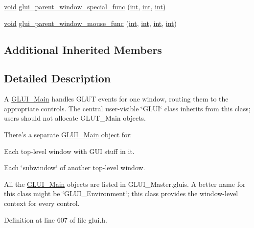 \begin{DoxyCompactItemize}
\item 
\hyperlink{wglext_8h_a9e6b7f1933461ef318bb000d6bd13b83}{void} \hyperlink{class_g_l_u_i___main_ab729b572b9acaffe3ebc827b6cfd72ca}{glui\+\_\+parent\+\_\+window\+\_\+special\+\_\+func} (\hyperlink{wglext_8h_a500a82aecba06f4550f6849b8099ca21}{int}, \hyperlink{wglext_8h_a500a82aecba06f4550f6849b8099ca21}{int}, \hyperlink{wglext_8h_a500a82aecba06f4550f6849b8099ca21}{int})
\item 
\hyperlink{wglext_8h_a9e6b7f1933461ef318bb000d6bd13b83}{void} \hyperlink{class_g_l_u_i___main_a391c1191451c678e7702e593e74dc5a4}{glui\+\_\+parent\+\_\+window\+\_\+mouse\+\_\+func} (\hyperlink{wglext_8h_a500a82aecba06f4550f6849b8099ca21}{int}, \hyperlink{wglext_8h_a500a82aecba06f4550f6849b8099ca21}{int}, \hyperlink{wglext_8h_a500a82aecba06f4550f6849b8099ca21}{int}, \hyperlink{wglext_8h_a500a82aecba06f4550f6849b8099ca21}{int})
\end{DoxyCompactItemize}
\subsection*{Additional Inherited Members}


\subsection{Detailed Description}
A \hyperlink{class_g_l_u_i___main}{G\+L\+U\+I\+\_\+\+Main} handles G\+L\+U\+T events for one window, routing them to the appropriate controls. The central user-\/visible \char`\"{}\+G\+L\+U\+I\char`\"{} class inherits from this class; users should not allocate G\+L\+U\+T\+\_\+\+Main objects.

There's a separate \hyperlink{class_g_l_u_i___main}{G\+L\+U\+I\+\_\+\+Main} object for\+:
\begin{DoxyItemize}
\item Each top-\/level window with G\+U\+I stuff in it.
\end{DoxyItemize}

Each \char`\"{}subwindow\char`\"{} of another top-\/level window.

All the \hyperlink{class_g_l_u_i___main}{G\+L\+U\+I\+\_\+\+Main} objects are listed in G\+L\+U\+I\+\_\+\+Master.\+gluis. A better name for this class might be \char`\"{}\+G\+L\+U\+I\+\_\+\+Environment\char`\"{}; this class provides the window-\/level context for every control. 

Definition at line 607 of file glui.\+h.




